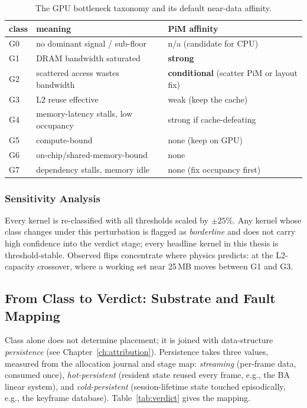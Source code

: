 \begin{table}[t]
\centering
\caption{The GPU bottleneck taxonomy and its default near-data affinity.}
\label{tab:taxonomy}
\begin{tabular}{@{}llp{}@{}}
\toprule
class & meaning & PiM affinity \\
\midrule
G0 & no dominant signal / sub-floor & n/a (candidate for CPU) \\
G1 & DRAM bandwidth saturated & \textbf{strong} \\
G2 & scattered access wastes bandwidth & \textbf{conditional} (scatter PiM or layout fix) \\
G3 & L2 reuse effective & weak (keep the cache) \\
G4 & memory-latency stalls, low occupancy & strong if cache-defeating \\
G5 & compute-bound & none (keep on GPU) \\
G6 & on-chip/shared-memory-bound & none \\
G7 & dependency stalls, memory idle & none (fix occupancy first) \\
\bottomrule
\end{tabular}
\end{table}

\subsubsection{Sensitivity Analysis}
\label{sec:met-sensitivity}
Every kernel is re-classified with all thresholds scaled by $\pm 25\%$. Any kernel whose class changes under this perturbation is flagged as \emph{borderline} and does not carry high confidence into the verdict stage; every headline kernel in this thesis is threshold-stable. Observed flips concentrate where physics predicts: at the L2-capacity crossover, where a working set near 25\,MB moves between G1 and G3.

\subsection{From Class to Verdict: Substrate and Fault Mapping}
\label{sec:met-verdict}

Class alone does not determine placement; it is joined with data-structure \emph{persistence} (see Chapter~\ref{ch:attribution}). Persistence takes three values, measured from the allocation journal and stage map: \emph{streaming} (per-frame data, consumed once), \emph{hot-persistent} (resident state reused every frame, e.g., the BA linear system), and \emph{cold-persistent} (session-lifetime state touched episodically, e.g., the keyframe database). Table~\ref{tab:verdict} gives the mapping.

